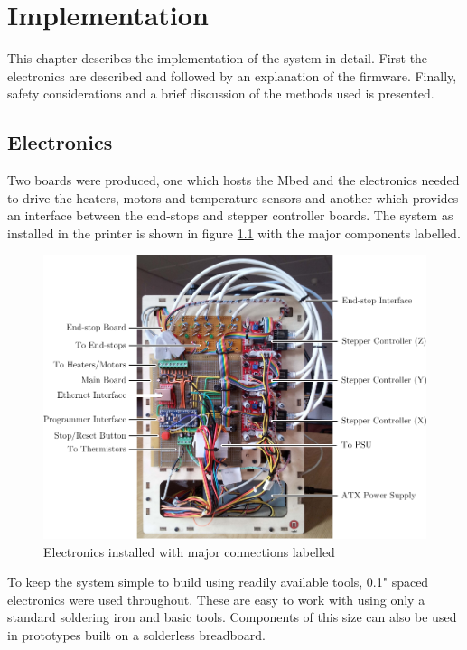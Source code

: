 \chapter{Implementation}
	
	\label{sec:implementation}
	
	This chapter describes the implementation of the system in detail. First the
	electronics are described and followed by an explanation of the firmware.
	Finally, safety considerations and a brief discussion of the methods used is
	presented.
	
	
	\section{Electronics}
		
		
		Two boards were produced, one which hosts the Mbed and the electronics
		needed to drive the heaters, motors and temperature sensors and another
		which provides an interface between the end-stops and stepper controller
		boards. The system as installed in the printer is shown in figure
		\ref{fig:electronicsPhoto} with the major components labelled.
		
		\begin{figure}
			\includegraphics[width=1\textwidth]{diagrams/electronicsPhoto.pdf}
			\caption{Electronics installed with major connections labelled}
			\label{fig:electronicsPhoto}
		\end{figure}
		
		To keep the system simple to build using readily available tools, 0.1"
		spaced electronics were used throughout. These are easy to work with using
		only a standard soldering iron and basic tools. Components of this size can
		also be used in prototypes built on a solderless breadboard.
		

